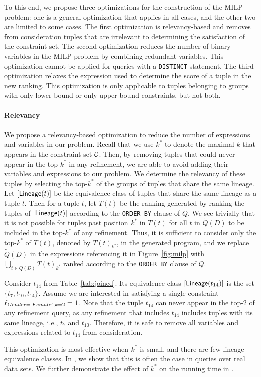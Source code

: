 To this end, we propose three optimizations for the construction of the MILP problem: one is a general optimization that applies in all cases, and the other two are limited to some cases. The first optimization is relevancy-based and removes from consideration tuples that are irrelevant to determining the satisfaction of the constraint set. The second optimization reduces the number of binary variables in the MILP problem by combining redundant variables. This optimization cannot be applied for queries with a {\tt DISTINCT} statement. %
The third optimization relaxes the expression used to determine the score of a tuple in the new ranking. This optimization is only applicable to tuples belonging to groups with only lower-bound or only upper-bound constraints, but not both.


\paragraph*{\textbf{Relevancy}}
We propose a relevancy-based optimization to reduce the number of expressions and variables in our problem.
Recall that we use $k^*$ to denote the maximal $k$ that appears in the constraint set $\mathcal{C}$. Then, by removing tuples that could never appear in the top-$k^*$ in any refinement, we are able to avoid adding their variables and expressions to our problem. We determine the relevancy of these tuples by selecting the top-$k^*$ of the groups of tuples that share the same lineage. Let $[\textsf{Lineage}(t)]$ be the equivalence class of tuples that share the same lineage as a tuple $t$. Then for a tuple $t$, let $T(t)$ be the ranking generated by ranking the tuples of $[\textsf{Lineage}(t)]$ according to the {\tt ORDER BY} clause of $Q$. We see trivially that it is not possible for tuples past position $k^*$ in $T(t)$ for all $t$ in $\widetilde{Q}(D)$ to be included in the top-$k^*$ of any refinement. Thus, it is sufficient to consider only the top-$k^*$ of $T(t)$, denoted by $T(t)_{k^*}$, in the generated program, and we replace $\widetilde{Q}(D)$ in the expressions referencing it in Figure~\ref{fig:milp} with $\bigcup_{t \in \widetilde{Q}(D)} T(t)_{k^*}$ ranked according to the {\tt ORDER BY} clause of $Q$. 



\begin{example}\label{ex:optimization1}
    Consider $t_{14}$ from Table~\ref{tab:joined}. Its equivalence class $[\textsf{Lineage}(t_{14})]$ is the set $\{t_7, t_{10}, t_{14}\}$. Assume we are interested in satisfying a single constraint $\ell_{Gender=`Female', k=2} = 1$. Note that the tuple $t_{14}$ can never appear in the top-$2$ of any refinement query, as any refinement that includes $t_{14}$ includes tuples with its same lineage, i.e., $t_7$ and $t_{10}$. Therefore, it is safe to remove all variables and expressions related to $t_{14}$ from consideration.
\end{example}
This optimization is most effective when $k^*$ is small, and there are few lineage equivalence classes. In , we show that this is often the case in queries over real data sets. We further demonstrate the effect of $k^*$ on the running time in .




